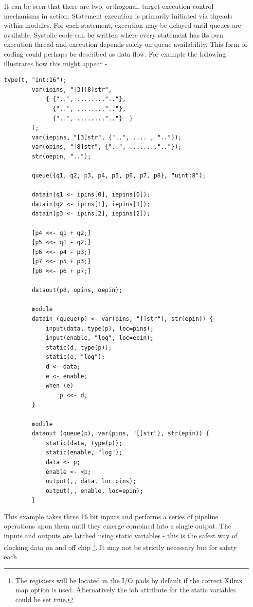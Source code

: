 \documentclass[10pt,a4paper,twoside,fleqn]{article}
\begin{document}
    It can be seen that there are two, orthogonal, target execution control
    mechanisms in action. Statement execution is primarily initiated via threads
    within modules. For each statement, execution may be delayed until queues are
    available. Systolic code can be written where every statement has its own
    execution thread and execution depends solely on queue availability. This form
    of coding could perhaps be described as data flow. For example the following
    illustrates how this might appear -
    \begin{lstlisting}[language=threepl]
        type(t, "int:16");
        var(ipins, "[3][8]str",
            { {"..", ........".."},
              {"..", ........".."},
              {"..", ........".."}  }
        );
        var(iepins, "[3]str", {"..", .... , ".."});
        var(opins, "[8]str", {"..", ........".."});
        str(oepin, "..");
        
        queue({q1, q2, p3, p4, p5, p6, p7, p8}, "uint:8");

        datain(q1 <- ipins[0], iepins[0]);
        datain(q2 <- ipins[1], iepins[1]);
        datain(p3 <- ipins[2], iepins[2]);
        
        [p4 <<- q1 + q2;]
        [p5 <<- q1 - q2;]
        [p6 <<- p4 - p3;]
        [p7 <<- p5 + p3;]
        [p8 <<- p6 + p7;]
        
        dataout(p8, opins, oepin);
        
        module
        datain (queue(p) <- var(pins, "[]str"), str(epin)) {
            input(data, type(p), loc=pins);
            input(enable, "log", loc=epin);
            static(d, type(p));
            static(e, "log");
            d <- data;
            e <- enable;
            when (e)
                p <<- d;
        }
        
        module
        dataout (queue(p), var(pins, "[]str"), str(epin)) {
            static(data, type(p));
            static(enable, "log");
            data <- p;
            enable <- <p;                
            output(,, data, loc=pins);
            output(,, enable, loc=epin);
        }
    \end{lstlisting}
    This example takes three 16 bit inputs and performs a series of pipeline operations
    upon them until they emerge combined into a single output. The inputs and outputs
    are latched using static variables - this is the safest way of clocking data on and
    off chip \footnote{The registers will be located in the I/O pads by default if the
    correct Xilinx map option is used. Alternatively the iob attribute for the static
    variables could be set true.}. It may not be strictly necessary but for safety each
\end{document}
